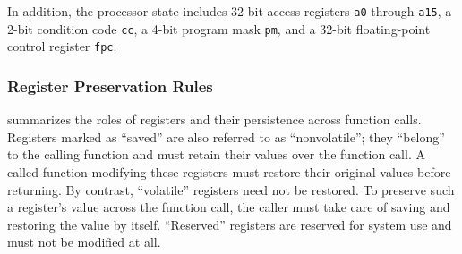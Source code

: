 \documentclass[USenglish,fontsize=11pt,twoside,%
  toc=bib,toc=idx,toc=graduated,numbers=noendperiod,
  bookmarks=true,
  bookmarksnumbered=true,
  bookmarksopen=true,
  bookmarksopenlevel=1,
  breaklinks=true,
  colorlinks=true,
  linkcolor=black,
  pdfpagelayout={TwoPageRight},
  pdfusetitle=true
]{scrreprt}
\begin{document}
In addition, the processor state includes 32-bit access registers
\texttt{a0} through \texttt{a15}, a 2-bit condition
code \texttt{cc}, a 4-bit program mask \texttt{pm},
and a 32-bit floating-point control register \texttt{fpc}.

\subsubsection{Register Preservation Rules}
 summarizes the roles of registers and their
persistence across function calls.
Registers marked as ``saved'' are also referred to as
``nonvolatile''; they ``belong'' to the calling
function and must retain their values over the function call.  A called
function modifying these registers must restore their original values
before returning.  By contrast, ``volatile'' registers
need not be restored.  To preserve such a register's value across the
function call, the caller must take care of saving and restoring the value
by itself.  ``Reserved'' registers are reserved for system use and must
not be modified at all.
\end{document}
